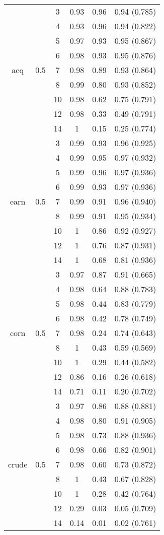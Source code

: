 \begin{table}[]
{\begin{tabular}{| c | c | c | c | c | c | }
		
		
		
		&& 3 & 0.93 & 0.96 & 0.94 (0.785)    \\ 
		&& 4 & 0.93 & 0.96 &  0.94  (0.822)  \\
			&& 5 & 0.97 & 0.93 & 0.95  (0.867)   \\ 
		&& 6 & 0.98 & 0.93 & 0.95 (0.876)    \\
	acq	&0.5& 7 & 0.98 & 0.89 & 0.93 (0.864)    \\
		&& 8 & 0.99 & 0.80 & 0.93  (0.852)   \\
		&& 10 & 0.98 & 0.62 & 0.75  (0.791)   \\
		&& 12 & 0.98 & 0.33 & 0.49  (0.791)   \\
		&& 14 & 1 & 0.15 & 0.25  (0.774)   \\ \hline
		
		
		
		&& 3 & 0.99 & 0.93 & 0.96  (0.925)   \\ 
	&& 4 & 0.99 & 0.95 &  0.97  (0.932) \\
	&	& 5 & 0.99 & 0.96 & 0.97   (0.936)  \\ 
	&& 6 & 0.99 & 0.93 & 0.97  (0.936)   \\
	earn&0.5& 7 & 0.99 & 0.91 & 0.96 (0.940)    \\
	&& 8 & 0.99 & 0.91 & 0.95  (0.934)   \\
	&& 10 & 1 & 0.86 & 0.92  (0.927)   \\
	&& 12 & 1 & 0.76 & 0.87  (0.931)   \\
	&& 14 & 1 & 0.68 & 0.81  (0.936)   \\ \hline
	
		
		&& 3 & 0.97 & 0.87 & 0.91  (0.665)   \\ 
		&& 4 & 0.98 & 0.64 & 0.88  (0.783)   \\ 
		&	& 5 & 0.98 & 0.44 &  0.83  (0.779)  \\ 
		&& 6 & 0.98 & 0.42 & 0.78   (0.749)  \\ 
		corn&0.5& 7 & 0.98 & 0.24 & 0.74  (0.643)  \\ 
		&& 8 & 1 & 0.43& 0.59  (0.569)   \\ 
		&& 10 & 1 & 0.29& 0.44  (0.582)   \\ 
		&& 12 & 0.86 & 0.16& 0.26  (0.618)   \\ 
		&& 14 & 0.71 & 0.11& 0.20  (0.702)   \\ 
								\hline
		
		
		&& 3 & 0.97 & 0.86 &  0.88  (0.881)  \\ 
		&& 4 & 0.98 & 0.80 & 0.91  (0.905)   \\ 
		 && 5 & 0.98 & 0.73 &  0.88 (0.936)   \\ 
		&& 6 & 0.98 & 0.66 &  0.82  (0.901)  \\
		crude&0.5& 7 & 0.98 & 0.60 &  0.73 (0.872)  \\
		&& 8 & 1 & 0.43 &  0.67   (0.828) \\ 
		&& 10 & 1 & 0.28 &  0.42   (0.764) \\ 
		&& 12 & 0.29 & 0.03 &  0.05   (0.709) \\ 
		&& 14 & 0.14 & 0.01 &  0.02   (0.761) \\ \hline 
		

\end{tabular}}
\end{table}
